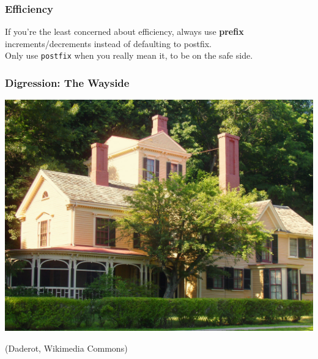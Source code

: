 \begin{frame}
  \frametitle{Efficiency}

  
  If you're the least concerned about efficiency, always use
  {\bf prefix} increments/decrements instead of defaulting to postfix.\\[1em]

  Only use {\tt postfix} when you really mean it, to be on the safe side.
  
\end{frame}


\begin{frame}
  \frametitle{Digression: The Wayside}

  \begin{center}
    \includegraphics[width=.7\textwidth]{images/The_Wayside_Concord_Massachusetts}
  \end{center}
\hfill (Daderot, Wikimedia Commons)

\end{frame}

